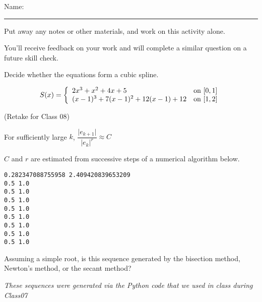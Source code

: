 \documentclass[12pt,letterpaper,noanswers]{exam}
\begin{document}
 \pdfpageheight 11in 
  \pdfpagewidth 8.5in

\noindent Name: \rule{2.5in}{0.5pt}

\noindent Put away any notes or other materials, and work on this activity alone.

\noindent You'll receive feedback on your work and will complete a similar question on a future skill check.


\begin{questions}
\item 
Decide whether the equations form a cubic spline.

\[S(x) = \left\{\begin{array}{l l}
2x^3 + x^2 + 4x + 5 & \text{on }[0,1] \\
(x-1)^3 + 7(x-1)^2 + 12(x-1) + 12 & \text{on }[1,2] \\
\end{array}\right.\]

\vspace{6.5cm}

\item (Retake for Class 08)

For sufficiently large $k$, $\dfrac{\vert e_{k+1}\vert}{\vert e_k\vert^r} \approx C$

$C$ and $r$ are estimated from successive steps of a numerical algorithm below.

\begin{verbatim}
0.282347088755958 2.409420839653209
0.5 1.0
0.5 1.0
0.5 1.0
0.5 1.0
0.5 1.0
0.5 1.0
0.5 1.0
0.5 1.0
\end{verbatim}

Assuming a simple root, is this sequence generated by the bisection method, Newton's method, or the secant method?

\emph{These sequences were generated via the Python code that we used in class during Class07}

\end{questions}
\end{document}
